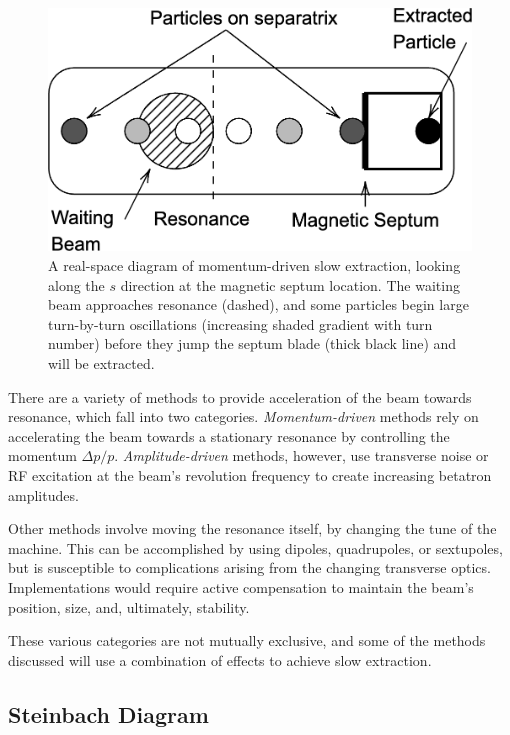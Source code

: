 \documentclass[a4paper,twoside,11pt]{report}
\begin{document}
\begin{figure}
  \centering
  \includegraphics[width=0.6\linewidth]{real-world.png}
  \caption[Real-space diagram of momentum-driven slow extraction]{A real-space diagram of momentum-driven slow extraction, looking along the $s$ direction at the magnetic septum location. The waiting beam approaches resonance (dashed), and some particles begin large turn-by-turn oscillations (increasing shaded gradient with turn number) before they jump the septum blade (thick black line) and will be extracted.}\label{fig:real-world}
\end{figure}

There are a variety of methods to provide acceleration of the beam towards resonance, which fall into two categories. \textit{Momentum-driven} methods rely on accelerating the beam towards a stationary resonance by controlling the momentum $\Delta p/p$. \textit{Amplitude-driven} methods, however, use transverse noise or RF excitation at the beam's revolution frequency to create increasing betatron amplitudes. 

Other methods involve moving the resonance itself, by changing the tune of the machine. This can be accomplished by using dipoles, quadrupoles, or sextupoles, but is susceptible to complications arising from the changing transverse optics. Implementations would require active compensation to maintain the beam's position, size, and, ultimately, stability.%

These various categories are not mutually exclusive, and some of the methods discussed will use a combination of effects to achieve slow extraction.

\subsection{Steinbach Diagram}\label{sec:steinbach}
\end{document}
